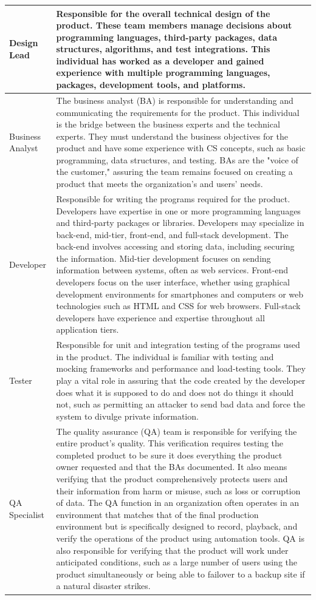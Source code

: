 \begin{longtable}[H]{p{.8in}|p{3.6in}}
	\hline
	\Tstrut Design Lead & Responsible for the overall technical design of the product. These team members manage decisions about programming languages, third-party packages, data structures, algorithms, and test integrations. This individual has worked as a developer and gained experience with multiple programming languages, packages, development tools, and platforms.\\
	\hline
	\Tstrut Business Analyst & The business analyst (BA) is responsible for understanding and communicating the requirements for the product. This individual is the bridge between the business experts and the technical experts. They must understand the business objectives for the product and have some experience with CS concepts, such as basic programming, data structures, and testing. BAs are the "voice of the customer," assuring the team remains focused on creating a product that meets the organization's and users' needs.\\
	\hline
	\Tstrut Developer & Responsible for writing the programs required for the product. Developers have expertise in one or more programming languages and third-party packages or libraries. Developers may specialize in back-end, mid-tier, front-end, and full-stack development. The back-end involves accessing and storing data, including securing the information. Mid-tier development focuses on sending information between systems, often as web services. Front-end developers focus on the user interface, whether using graphical development environments for smartphones and computers or web technologies such as HTML and CSS for web browsers. Full-stack developers have experience and expertise throughout all application tiers. \\
	\hline
	\Tstrut Tester & Responsible for unit and integration testing of the programs used in the product. The individual is familiar with testing and mocking frameworks and performance and load-testing tools. They play a vital role in assuring that the code created by the developer does what it is supposed to do and does not do things it should not, such as permitting an attacker to send bad data and force the system to divulge private information.\\
	\hline
	\Tstrut QA \linebreak Specialist & The quality assurance (QA) team is responsible for verifying the entire product's quality. This verification requires testing the completed product to be sure it does everything the product owner requested and that the BAs documented. It also means verifying that the product comprehensively protects users and their information from harm or misuse, such as loss or corruption of data. The QA function in an organization often operates in an environment that matches that of the final production environment but is specifically designed to record, playback, and verify the operations of the product using automation tools. QA is also responsible for verifying that the product will work under anticipated conditions, such as a large number of users using the product simultaneously or being able to failover to a backup site if a natural disaster strikes.\\

\end{longtable}

